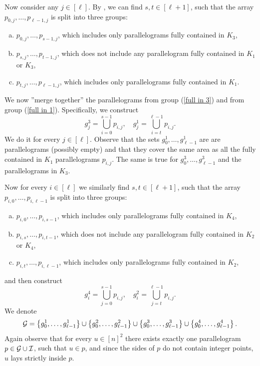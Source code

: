 \documentclass[11pt]{article}
\newcommand{\set}[1]{\left\lbrace #1 \right\rbrace}
\theoremstyle{plain}
\theoremstyle{definition}
\theoremstyle{remark}
\begin{document}
Now consider any $j \in [\ell]$.
By , we can find $s, t \in [\ell + 1]$, such that the array $p_{0, j}, \dots, p_{\ell - 1, j}$ is split into three groups:
\begin{enumerate}[a)]
	\item $p_{0, j}, \dots, p_{s - 1, j}$, which includes only parallelograms fully contained in $K_3$, \label{full in 3}
	\item $p_{s, j}, \dots, p_{t - 1, j}$, which does not include any parallelogram fully contained in $K_1$ or $K_3$,
	\item $p_{t, j}, \dots, p_{\ell - 1, j}$, which includes only parallelograms fully contained in $K_1$. \label{full in 1}
\end{enumerate}
We now ''merge together'' the parallelograms from group (\ref{full in 3}) and from group (\ref{full in 1}).
Specifically, we construct
\[
g^3_j = \bigcup_{i = 0}^{s - 1} p_{i, j}, \quad 
g^1_j = \bigcup_{i = t}^{\ell - 1} p_{i, j}.
\]
We do it for every $j \in [\ell]$.
Observe that the sets $g^1_0, \dots, g^1_{\ell - 1}$ are are parallelograms (possibly empty) and that they cover the same area as all the fully contained in $K_1$ parallelograms $p_{i, j}$.
The same is true for $g^3_0, \dots, g^3_{\ell - 1}$ and the parallelograms in $K_3$. 

Now for every $i \in [\ell]$ we similarly find $s, t \in [\ell + 1]$, such that the array $p_{i, 0}, \dots, p_{i, \ell - 1}$ is split into three groups:
\begin{enumerate}[a)]
	\item $p_{i, 0}, \dots, p_{i, s - 1}$, which includes only parallelograms fully contained in $K_4$,
	\item $p_{i, s}, \dots, p_{i, t - 1}$, which does not include any parallelogram fully contained in $K_2$ or $K_4$,
	\item $p_{i, t}, \dots, p_{i, \ell - 1}$, which includes only parallelograms fully contained in $K_2$,
\end{enumerate}
and then construct
\[
g^4_i = \bigcup_{j = 0}^{s - 1} p_{i, j}, \quad 
g^2_i = \bigcup_{j = t}^{\ell - 1} p_{i, j}.
\]
We denote
\[
\G = \set{g^1_0, \dots, g^1_{\ell - 1}}  
\cup \set{g^2_0, \dots, g^2_{\ell - 1}}
\cup \set{g^3_0, \dots, g^3_{\ell - 1}}
\cup \set{g^4_0, \dots, g^4_{\ell - 1}}.
\]
Again observe that for every $u \in [n]^2$ there exists exactly one parallelogram $p \in \mathcal{G} \cup \mathcal{I}$, such that $u \in p$, and since the sides of $p$ do not contain integer points, $u$ lays strictly inside $p$.
\end{document}
